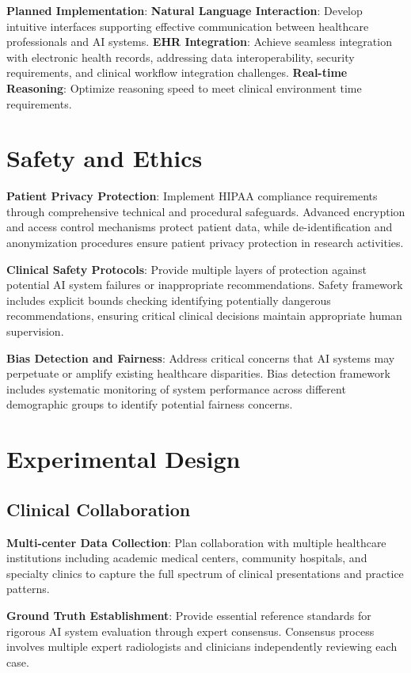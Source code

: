 \textbf{Planned Implementation}:
\textbf{Natural Language Interaction}: Develop intuitive interfaces supporting effective communication between healthcare professionals and AI systems.
\textbf{EHR Integration}: Achieve seamless integration with electronic health records, addressing data interoperability, security requirements, and clinical workflow integration challenges.
\textbf{Real-time Reasoning}: Optimize reasoning speed to meet clinical environment time requirements.

\section{Safety and Ethics}

\textbf{Patient Privacy Protection}: Implement HIPAA compliance requirements through comprehensive technical and procedural safeguards. Advanced encryption and access control mechanisms protect patient data, while de-identification and anonymization procedures ensure patient privacy protection in research activities.

\textbf{Clinical Safety Protocols}: Provide multiple layers of protection against potential AI system failures or inappropriate recommendations. Safety framework includes explicit bounds checking identifying potentially dangerous recommendations, ensuring critical clinical decisions maintain appropriate human supervision.

\textbf{Bias Detection and Fairness}: Address critical concerns that AI systems may perpetuate or amplify existing healthcare disparities. Bias detection framework includes systematic monitoring of system performance across different demographic groups to identify potential fairness concerns.

\section{Experimental Design}

\subsection{Clinical Collaboration}

\textbf{Multi-center Data Collection}: Plan collaboration with multiple healthcare institutions including academic medical centers, community hospitals, and specialty clinics to capture the full spectrum of clinical presentations and practice patterns.

\textbf{Ground Truth Establishment}: Provide essential reference standards for rigorous AI system evaluation through expert consensus. Consensus process involves multiple expert radiologists and clinicians independently reviewing each case.


